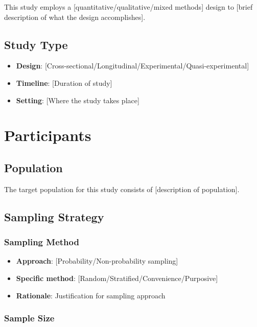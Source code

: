 \documentclass[
  12pt,
  letterpaper,
  12pt,
  letterpaper,
  oneside]{report}
\providecommand{\tightlist}{%
  \setlength{\itemsep}{0pt}\setlength{\parskip}{0pt}}
\begin{document}
This study employs a {[}quantitative/qualitative/mixed methods{]} design
to {[}brief description of what the design accomplishes{]}.

\subsection{Study Type}\label{study-type}

\begin{itemize}
\tightlist
\item
  \textbf{Design}:
  {[}Cross-sectional/Longitudinal/Experimental/Quasi-experimental{]}
\item
  \textbf{Timeline}: {[}Duration of study{]}
\item
  \textbf{Setting}: {[}Where the study takes place{]}
\end{itemize}

\section{Participants}\label{participants}

\subsection{Population}\label{population}

The target population for this study consists of {[}description of
population{]}.

\subsection{Sampling Strategy}\label{sampling-strategy}

\subsubsection{Sampling Method}\label{sampling-method}

\begin{itemize}
\tightlist
\item
  \textbf{Approach}: {[}Probability/Non-probability sampling{]}
\item
  \textbf{Specific method}:
  {[}Random/Stratified/Convenience/Purposive{]}
\item
  \textbf{Rationale}: Justification for sampling approach
\end{itemize}

\subsubsection{Sample Size}\label{sample-size}
\end{document}
